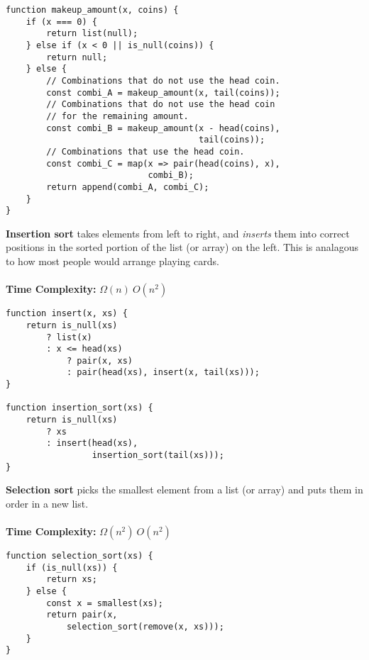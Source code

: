 \documentclass[a4paper]{article} \usepackage[backend=biber, style=numeric, sorting=none]{biblatex}
\begin{document}
\begin{multicols*}{4}
\begin{verbatim}
function makeup_amount(x, coins) {
    if (x === 0) {
        return list(null);
    } else if (x < 0 || is_null(coins)) {
        return null;
    } else {
        // Combinations that do not use the head coin.
        const combi_A = makeup_amount(x, tail(coins));
        // Combinations that do not use the head coin
        // for the remaining amount.
        const combi_B = makeup_amount(x - head(coins),
                                      tail(coins));
        // Combinations that use the head coin.
        const combi_C = map(x => pair(head(coins), x),
                            combi_B);
        return append(combi_A, combi_C);
    }
}
\end{verbatim}
\vfill\null
\columnbreak

{\small\textbf{Insertion sort}} takes elements from left to right, and \textit{inserts} them into correct positions in the sorted portion of the list (or array) on the left. This is analagous to how most people would arrange playing cards.
\\ \\
\textbf{Time Complexity:} $\Omega(n)\ O(n^{2})$
\begin{verbatim}
function insert(x, xs) {
    return is_null(xs)
        ? list(x)
        : x <= head(xs)
            ? pair(x, xs)
            : pair(head(xs), insert(x, tail(xs)));
}

function insertion_sort(xs) {
    return is_null(xs)
        ? xs
        : insert(head(xs),
                 insertion_sort(tail(xs)));
}
\end{verbatim}

{\small\textbf{Selection sort}} picks the smallest element from a list (or array) and puts them in order in a new list.
\\ \\
\textbf{Time Complexity:} $\Omega(n^{2})\ O(n^{2})$
\begin{verbatim}
function selection_sort(xs) {
    if (is_null(xs)) {
        return xs;
    } else {
        const x = smallest(xs);
        return pair(x,
            selection_sort(remove(x, xs)));
    }
}


\end{verbatim}
\end{multicols*}
\end{document}
